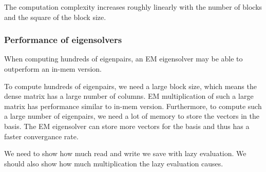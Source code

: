The computation complexity increases roughly linearly with the number of blocks
and the square of the block size.

\subsubsection{Performance of eigensolvers}

When computing hundreds of eigenpairs, an EM eigensolver may be able to outperform
an in-mem version.

To compute hundreds of eigenpairs, we need a large block size, which means
the dense matrix has a large number of columns. EM multiplication of such
a large matrix has performance similar to in-mem version. Furthermore,
to compute such a large number of eigenpairs, we need a lot of memory to
store the vectors in the basis. The EM eigensolver can store more vectors
for the basis and thus has a faster convergance rate.

We need to show how much read and write we save with lazy evaluation. We should
also show how much multiplication the lazy evaluation causes.
